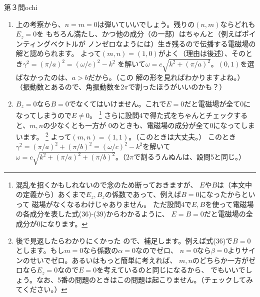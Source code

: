 \begin{answer}{第３問}{ochi}
\begin{enumerate}
\item
  上の考察から、$n=m=0$は弾いていいでしょう。残りの$(n,m)$ならどれも$E_z=0$を
  もちろん満たし、かつ他の成分（の一部）はちゃんと（例えばポインティングベクトルが
  ノンゼロなようには）生き残るので伝播する電磁場の解と認められます。
  よって$(m,n)=(1,0)$がよく（理由は後述）、そのとき$\gamma^2=(\pi/a)^2=(\omega/c)^2-k^2$
  を解いて$\omega=c\sqrt{k^2+(\pi/a)^2}$。$(0,1)$を選ばなかったのは、$a>b$だから。（この
  解の形を見ればわかりますよね。）
  （振動数とあるので、角振動数を$2\pi$で割ったほうがいいのかも？）

\item
  $B_z=0$なら$B=0$でなくてはいけません。これで$E=0$だと電磁場が全て$0$になってしまうので$E\neq 0$。
  \footnote{混乱を招くかもしれないので念のため断っておきますが、
  $E$や$B$は（本文中の定義から）あくまで$E_z,B_z$の係数であって、例えば$B=0$になったからといって
  磁場がなくなるわけじゃありません。
  ただ設問4で$E,B$を使って電磁場の各成分を表した式(36)-(39)からわかるように、
  $E=B=0$だと電磁場の全成分が0になります。}
  さらに設問4で得た式をちゃんとチェックすると、$m,n$の少なくとも一方が
  $0$のときも、電磁場の成分が全て$0$になってしまいます。
  \footnote{後で見返したらわかりにくかった
  ので、補足します。例えば式(36)で$B=0$とします。もし$m=0$なら係数の$\alpha=0$なのでゼロ、
  $n=0$なら$\beta=0$よりサインのせいでゼロ。あるいはもっと簡単に考えれば、
  $m,n$のどちらか一方がゼロなら$E_z=0$なので$E=0$を考えているのと同じになるから、
  でもいいでしょう。なお、5番の問題のときはこの問題は起こりません。（チェックしてみてください。）}
  よって$(m,n)=(1,1)$。（このときは大丈夫。）
  このとき$\gamma^2=(\pi/a)^2+(\pi/b)^2=(\omega/c)^2-k^2$を解いて$\omega=c\sqrt{k^2+(\pi/a)^2
  +(\pi/b)^2}$。（$2\pi$で割るうんぬんは、設問5と同じ。）
\end{enumerate}
\end{answer}
